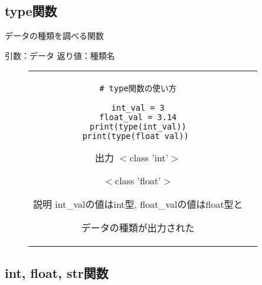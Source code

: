 \documentclass{jsarticle}
\begin{document}
\subsection{type関数}
データの種類を調べる関数 \par
引数：データ \hspace{5mm}
返り値：種類名
\vspace{-5mm}
\begin{figure}[h]
	\begin{tabular}{cc}
		\begin{minipage}[t]{.4\textwidth}
			\begin{lstlisting}[caption=type関数]
# type関数の使い方

int_val = 3
float_val = 3.14
print(type(int_val))
print(type(float_val)) \end{lstlisting}
		\end{minipage} \hspace{5mm}
		\begin{minipage}[t]{.5\textwidth}
			\begin{minipage}[t]{.4\textwidth}
				\begin{itembox}[l]{出力}
					$<$class 'int'$>$ \par
					$<$class 'float'$>$ \par
				\end{itembox}
			\end{minipage}
			\begin{itembox}[l]{説明}
				int\_valの値はint型, float\_valの値はfloat型と \par データの種類が出力された
			\end{itembox}
		\end{minipage} \hspace{5mm}
	\end{tabular}
\end{figure}

\newpage
\subsection{int, float, str関数}
\end{document}
